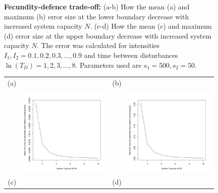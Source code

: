 \documentclass[preprint,10pt,reqno]{amsart}
\begin{document}
\begin{figure}[th]
  \label{fig:fdtoapprox}
   \caption{\textbf{Fecundity-defence trade-off:} (a-b)  How the mean (a) and maximum (b) error size at the lower boundary decrease with increased system capacity $N$. (c-d) How the mean (c) and maximum (d) error size at the upper boundary decrease with increased system capacity $N$. The error was calculated for intensities $I_1,I_2=0.1,0.2,0.3,...,0.9$ and time between disturbances $\ln(T_D)=1,2,3,...,8.$ Parameters used are $s_1=500,s_2=50$.}
   \end{figure}
    \begin{figure}[th]
\centering
   \begin{tabular}{rrrr}
   (a)&&(b)&\\
  &\includegraphics[width=2.5in]{GDmeanerr.pdf} && \includegraphics[width=2.5in]{GDmaxerr.pdf} \\
  (c)&&(d)&\\

\end{tabular}
\end{figure}
\end{document}
